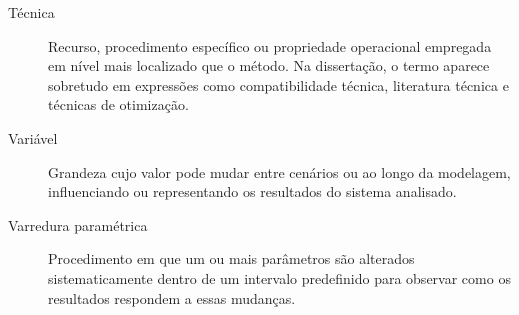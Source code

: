 \begin{description}
    \item[Técnica] Recurso, procedimento específico ou propriedade operacional empregada em nível mais localizado que o método. Na dissertação, o termo aparece sobretudo em expressões como compatibilidade técnica, literatura técnica e técnicas de otimização.

    \item[Variável] Grandeza cujo valor pode mudar entre cenários ou ao longo da modelagem, influenciando ou representando os resultados do sistema analisado.

    \item[Varredura paramétrica] Procedimento em que um ou mais parâmetros são alterados sistematicamente dentro de um intervalo predefinido para observar como os resultados respondem a essas mudanças.
\end{description}
